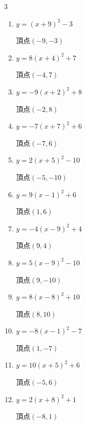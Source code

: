 \begin{multicols}{3}
\begin{enumerate}
  \item $\displaystyle y=\left( x+9\right)^{2}-3$

        $\displaystyle 頂点\left( -9 , -3 \right)$

  \item $\displaystyle y=8\left( x+4\right)^{2}+7$

        $\displaystyle 頂点\left( -4 , 7 \right)$

  \item $\displaystyle y=-9\left( x+2\right)^{2}+8$

        $\displaystyle 頂点\left( -2 , 8 \right)$

  \item $\displaystyle y=-7\left( x+7\right)^{2}+6$

        $\displaystyle 頂点\left( -7 , 6 \right)$

  \item $\displaystyle y=2\left( x+5\right)^{2}-10$

        $\displaystyle 頂点\left( -5 , -10 \right)$

  \item $\displaystyle y=9\left( x-1\right)^{2}+6$

        $\displaystyle 頂点\left( 1 , 6 \right)$

  \item $\displaystyle y=-4\left( x-9\right)^{2}+4$

        $\displaystyle 頂点\left( 9 , 4 \right)$

  \item $\displaystyle y=5\left( x-9\right)^{2}-10$

        $\displaystyle 頂点\left( 9 , -10 \right)$

  \item $\displaystyle y=8\left( x-8\right)^{2}+10$

        $\displaystyle 頂点\left( 8 , 10 \right)$

  \item $\displaystyle y=-8\left( x-1\right)^{2}-7$

        $\displaystyle 頂点\left( 1 , -7 \right)$

  \item $\displaystyle y=10\left( x+5\right)^{2}+6$

        $\displaystyle 頂点\left( -5 , 6 \right)$

  \item $\displaystyle y=2\left( x+8\right)^{2}+1$

        $\displaystyle 頂点\left( -8 , 1 \right)$


\end{enumerate}
\end{multicols}
